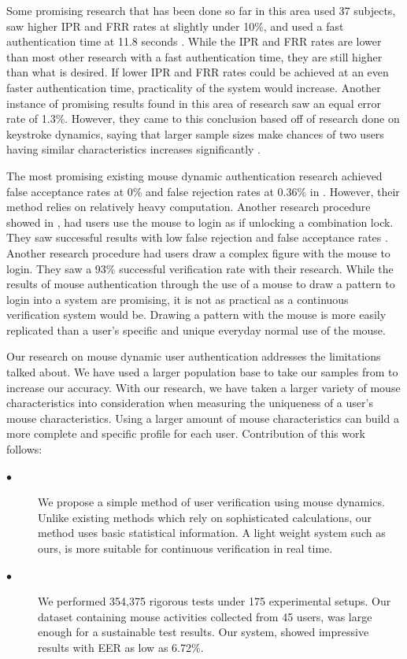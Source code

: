 \documentclass[conference]{IEEEtran}
\begin{document}
Some promising research that has been done so far in this area used 37 subjects, saw higher IPR and FRR rates at slightly under 10\%, and used a fast authentication time at 11.8 seconds \cite{CS}. While the IPR and FRR rates are lower than most other research with a fast authentication time, they are still higher than what is desired. If lower IPR and FRR rates could be achieved at an even faster authentication time, practicality of the system would increase. Another instance of promising results found in this area of research saw an equal error rate of 1.3\%. However, they came to this conclusion based off of research done on keystroke dynamics, saying that larger sample sizes make chances of two users having similar characteristics increases significantly \cite{Zhe}.

The most promising existing mouse dynamic authentication research achieved false acceptance rates at 0\% and false rejection rates at 0.36\% in \cite{Nak}. However, their method relies on relatively heavy computation. Another research procedure showed in \cite{Syu}, had users use the mouse to login as if unlocking a combination lock. They saw successful results with low false rejection and false acceptance rates \cite{HJ}. Another research procedure had users draw a complex figure with the mouse to login. They saw a 93\% successful verification rate with their research. While the results of mouse authentication through the use of a mouse to draw a pattern to login into a system are promising, it is not as practical as a continuous verification system would be. Drawing a pattern with the mouse is more easily replicated than a user’s specific and unique everyday normal use of the mouse.   

Our research on mouse dynamic user authentication addresses the limitations talked about. We have used a larger population base to take our samples from to increase our accuracy. With our research, we have taken a larger variety of mouse characteristics into consideration when measuring the uniqueness of a user’s mouse characteristics. Using a larger amount of mouse characteristics can build a more complete and specific profile for each user. 
Contribution of this work follows:

\begin{description}
  \item[$\bullet$] We propose a simple method of user verification using mouse dynamics. Unlike existing methods which rely on sophisticated calculations, our method uses basic statistical information. A light weight system such as ours, is more suitable for continuous verification in real time.  
  \item[$\bullet$] We performed 354,375 rigorous tests under 175 experimental setups. Our dataset containing mouse activities collected from 45 users, was large enough for a sustainable test results. Our system, showed impressive results with EER as low as 6.72\%.
\end{description} 
\end{document}

